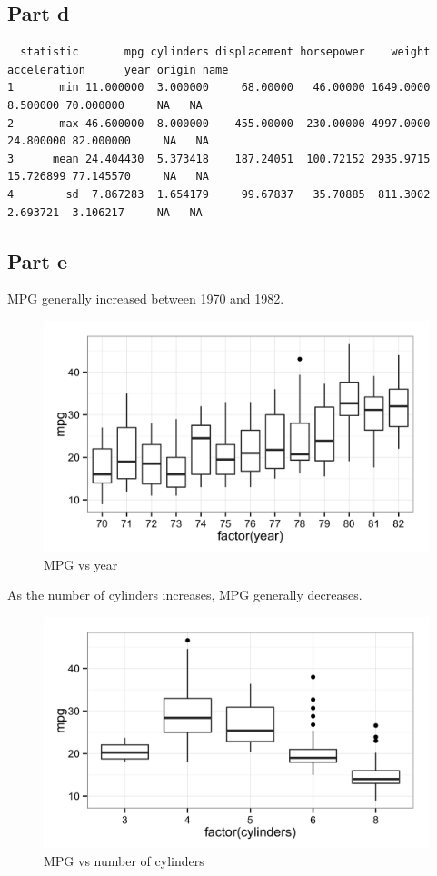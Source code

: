 \documentclass[11pt]{article}
\begin{document}
\subsection*{Part d}

\begin{verbatim}
  statistic       mpg cylinders displacement horsepower    weight acceleration      year origin name
1       min 11.000000  3.000000     68.00000   46.00000 1649.0000     8.500000 70.000000     NA   NA
2       max 46.600000  8.000000    455.00000  230.00000 4997.0000    24.800000 82.000000     NA   NA
3      mean 24.404430  5.373418    187.24051  100.72152 2935.9715    15.726899 77.145570     NA   NA
4        sd  7.867283  1.654179     99.67837   35.70885  811.3002     2.693721  3.106217     NA   NA
\end{verbatim}

\subsection*{Part e}


MPG generally increased between 1970 and 1982.
\begin{figure}[H]
	\centering
	\includegraphics[width=5in]{9e_mpg_vs_year.png}
	\caption{MPG vs year}
	\label{fig:mpg_vs_year}
\end{figure}

As the number of cylinders increases, MPG generally decreases.\begin{figure}[H]
	\centering
	\includegraphics[width=5in]{9e_mpg_by_cyl.png}
	\caption{MPG vs number of cylinders}
	\label{fig:mpg_vs_cyl}
\end{figure}
\end{document}
